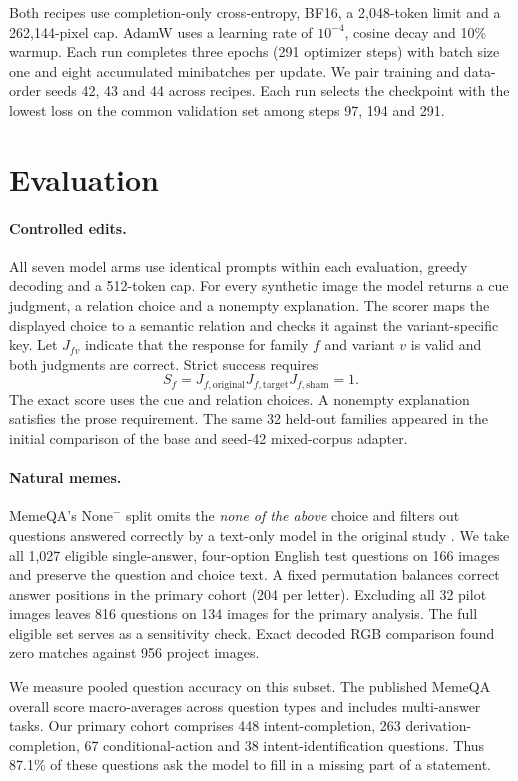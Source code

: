 \documentclass[11pt]{article}
\begin{document}
Both recipes use completion-only cross-entropy, BF16, a 2{,}048-token limit and a 262{,}144-pixel cap. AdamW uses a learning rate of $10^{-4}$, cosine decay and 10\% warmup. Each run completes three epochs (291 optimizer steps) with batch size one and eight accumulated minibatches per update. We pair training and data-order seeds 42, 43 and 44 across recipes. Each run selects the checkpoint with the lowest loss on the common validation set among steps 97, 194 and 291.

\section{Evaluation}

\paragraph{Controlled edits.}
All seven model arms use identical prompts within each evaluation, greedy decoding and a 512-token cap. For every synthetic image the model returns a cue judgment, a relation choice and a nonempty explanation. The scorer maps the displayed choice to a semantic relation and checks it against the variant-specific key. Let $J_{fv}$ indicate that the response for family $f$ and variant $v$ is valid and both judgments are correct. Strict success requires
\[
S_f = J_{f,\mathrm{original}} J_{f,\mathrm{target}} J_{f,\mathrm{sham}} = 1.
\]
The exact score uses the cue and relation choices. A nonempty explanation satisfies the prose requirement. The same 32 held-out families appeared in the initial comparison of the base and seed-42 mixed-corpus adapter.

\paragraph{Natural memes.}
MemeQA's $\mathrm{None}^{-}$ split omits the \emph{none of the above} choice and filters out questions answered correctly by a text-only model in the original study \citep{nguyen2025memeqa}. We take all 1{,}027 eligible single-answer, four-option English test questions on 166 images and preserve the question and choice text. A fixed permutation balances correct answer positions in the primary cohort (204 per letter). Excluding all 32 pilot images leaves 816 questions on 134 images for the primary analysis. The full eligible set serves as a sensitivity check. Exact decoded RGB comparison found zero matches against 956 project images.

We measure pooled question accuracy on this subset. The published MemeQA overall score macro-averages across question types and includes multi-answer tasks. Our primary cohort comprises 448 intent-completion, 263 derivation-completion, 67 conditional-action and 38 intent-identification questions. Thus 87.1\% of these questions ask the model to fill in a missing part of a statement.
\end{document}
